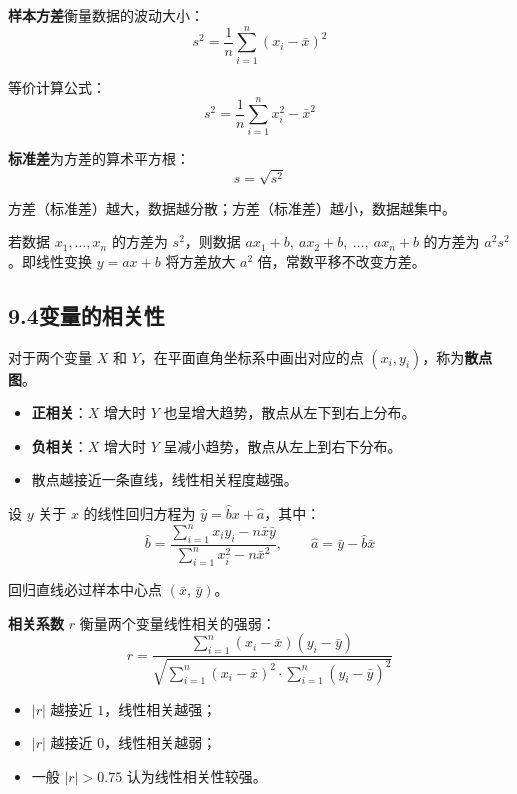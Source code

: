\documentclass[12pt, a4paper]{ctexart}
\begin{document}
\begin{knowledgebox}[方差与标准差]
\textbf{样本方差}衡量数据的波动大小：
\[
s^2 = \frac{1}{n}\sum_{i=1}^{n}(x_i - \bar{x})^2
\]

等价计算公式：
\[
s^2 = \frac{1}{n}\sum_{i=1}^{n} x_i^2 - \bar{x}^2
\]

\textbf{标准差}为方差的算术平方根：
\[
s = \sqrt{s^2}
\]

方差（标准差）越大，数据越分散；方差（标准差）越小，数据越集中。
\end{knowledgebox}

\begin{tipbox}[方差的性质]
若数据 $x_1, \ldots, x_n$ 的方差为 $s^2$，则数据 $ax_1+b,\ ax_2+b,\ \ldots,\ ax_n+b$ 的方差为 $a^2 s^2$。即线性变换 $y = ax + b$ 将方差放大 $a^2$ 倍，常数平移不改变方差。
\end{tipbox}

\subsection*{9.4\quad 变量的相关性}

\begin{knowledgebox}[散点图与相关关系]
对于两个变量 $X$ 和 $Y$，在平面直角坐标系中画出对应的点 $(x_i, y_i)$，称为\textbf{散点图}。
\begin{itemize}
  \item \textbf{正相关}：$X$ 增大时 $Y$ 也呈增大趋势，散点从左下到右上分布。
  \item \textbf{负相关}：$X$ 增大时 $Y$ 呈减小趋势，散点从左上到右下分布。
  \item 散点越接近一条直线，线性相关程度越强。
\end{itemize}
\end{knowledgebox}

\begin{knowledgebox}[线性回归方程]
设 $y$ 关于 $x$ 的线性回归方程为 $\hat{y} = \hat{b}x + \hat{a}$，其中：
\[
\hat{b} = \frac{\displaystyle\sum_{i=1}^{n} x_i y_i - n\bar{x}\bar{y}}{\displaystyle\sum_{i=1}^{n} x_i^2 - n\bar{x}^2}, \qquad \hat{a} = \bar{y} - \hat{b}\bar{x}
\]

回归直线必过样本中心点 $(\bar{x},\, \bar{y})$。
\end{knowledgebox}

\begin{knowledgebox}[相关系数]
\textbf{相关系数} $r$ 衡量两个变量线性相关的强弱：
\[
r = \frac{\displaystyle\sum_{i=1}^{n}(x_i - \bar{x})(y_i - \bar{y})}{\sqrt{\displaystyle\sum_{i=1}^{n}(x_i - \bar{x})^2 \cdot \sum_{i=1}^{n}(y_i - \bar{y})^2}}
\]

\begin{itemize}
  \item $|r|$ 越接近 $1$，线性相关越强；
  \item $|r|$ 越接近 $0$，线性相关越弱；
  \item 一般 $|r| > 0.75$ 认为线性相关性较强。
\end{itemize}
\end{knowledgebox}
\end{document}
